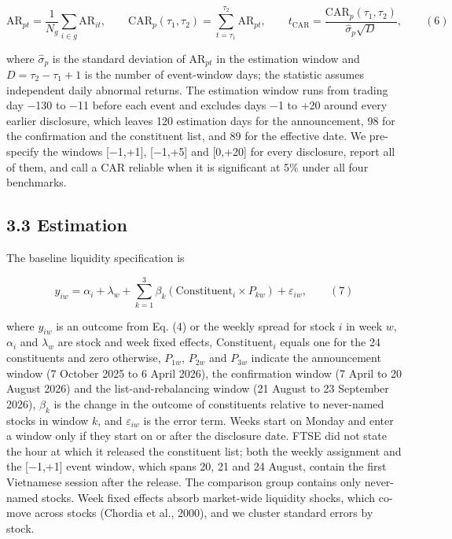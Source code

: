 \documentclass[review,authoryear,12pt]{elsarticle}
\begin{document}
\[\mathrm{AR}_{pt} = \frac{1}{N_g}\sum_{i \in g}\mathrm{AR}_{it}, \qquad \mathrm{CAR}_p(\tau_1, \tau_2) = \sum_{t=\tau_1}^{\tau_2}\mathrm{AR}_{pt}, \qquad t_{\mathrm{CAR}} = \frac{\mathrm{CAR}_p(\tau_1, \tau_2)}{\hat\sigma_p\sqrt{D}}, \qquad (6)\]

where \(\hat\sigma_p\) is the standard deviation of \(\mathrm{AR}_{pt}\)
in the estimation window and \(D = \tau_2 - \tau_1 + 1\) is the number
of event-window days; the statistic assumes independent daily abnormal
returns. The estimation window runs from trading day −130 to −11 before
each event and excludes days −1 to +20 around every earlier disclosure,
which leaves 120 estimation days for the announcement, 98 for the
confirmation and the constituent list, and 89 for the effective date. We
pre-specify the windows {[}−1,+1{]}, {[}−1,+5{]} and {[}0,+20{]} for
every disclosure, report all of them, and call a CAR reliable when it is
significant at 5\% under all four benchmarks.

\hypertarget{estimation}{%
\subsection*{3.3 Estimation}}

The baseline liquidity specification is

\[y_{iw} = \alpha_i + \lambda_w + \sum_{k=1}^{3}\beta_k\left(\mathrm{Constituent}_i \times P_{kw}\right) + \varepsilon_{iw}, \qquad (7)\]

where \(y_{iw}\) is an outcome from Eq. (4) or the weekly spread for
stock \(i\) in week \(w\), \(\alpha_i\) and \(\lambda_w\) are stock and
week fixed effects, \(\mathrm{Constituent}_i\) equals one for the 24
constituents and zero otherwise, \(P_{1w}\), \(P_{2w}\) and \(P_{3w}\)
indicate the announcement window (7 October 2025 to 6 April 2026), the
confirmation window (7 April to 20 August 2026) and the
list-and-rebalancing window (21 August to 23 September 2026),
\(\beta_k\) is the change in the outcome of constituents relative to
never-named stocks in window \(k\), and \(\varepsilon_{iw}\) is the
error term. Weeks start on Monday and enter a window only if they start
on or after the disclosure date. FTSE did not state the hour at which it
released the constituent list; both the weekly assignment and the
{[}−1,+1{]} event window, which spans 20, 21 and 24 August, contain the
first Vietnamese session after the release. The comparison group
contains only never-named stocks. Week fixed effects absorb market-wide
liquidity shocks, which co-move across stocks (Chordia et al., 2000),
and we cluster standard errors by stock.
\end{document}
